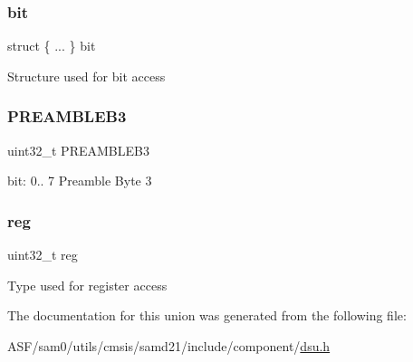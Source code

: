 \subsubsection{\texorpdfstring{bit}{bit}}
{\footnotesize\ttfamily struct \{ ... \}   bit}

Structure used for bit access \mbox{\label{union_d_s_u___c_i_d3___type_a9cffca5c6c08af4f95d0c25130ece9e3}} 
\subsubsection{\texorpdfstring{PREAMBLEB3}{PREAMBLEB3}}
{\footnotesize\ttfamily uint32\+\_\+t P\+R\+E\+A\+M\+B\+L\+E\+B3}

bit\+: 0.. 7 Preamble Byte 3 \mbox{\label{union_d_s_u___c_i_d3___type_a6b91636401516a477989a336376d7b40}} 
\subsubsection{\texorpdfstring{reg}{reg}}
{\footnotesize\ttfamily uint32\+\_\+t reg}

Type used for register access 

The documentation for this union was generated from the following file\+:\begin{DoxyCompactItemize}
\item 
A\+S\+F/sam0/utils/cmsis/samd21/include/component/\mbox{\hyperlink{component_2dsu_8h}{dsu.\+h}}\end{DoxyCompactItemize}
